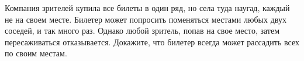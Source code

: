 Компания зрителей купила все билеты в один ряд, но села туда наугад, каждый не на своем месте. Билетер может попросить
поменяться местами любых двух соседей, и так много раз. Однако любой зритель, попав на свое место, затем пересаживаться
отказывается. Докажите, что билетер всегда может рассадить всех по своим местам.
